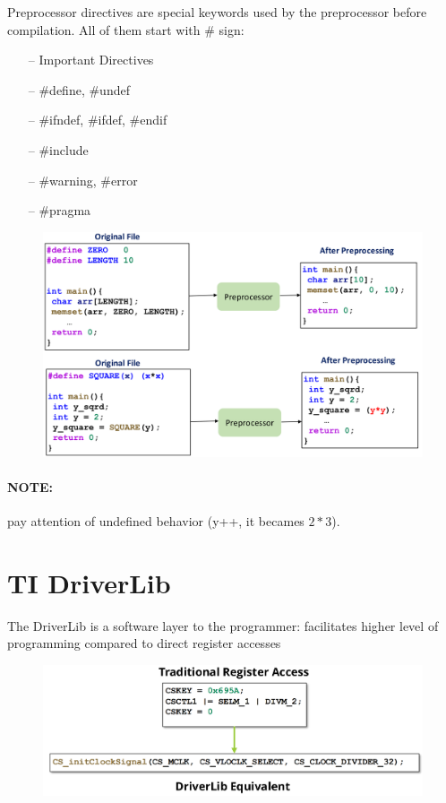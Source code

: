 Preprocessor directives are special keywords used by the preprocessor before compilation.
All of them start with \# sign:

\begin{itemize}
    \item[--] Important Directives
    \item[--] \#define, \#undef
    \item[--] \#ifndef, \#ifdef, \#endif
    \item[--] \#include
    \item[--] \#warning, \#error
    \item[--] \#pragma
\end{itemize}


\begin{figure}[H]
    \centering
    \includegraphics[width=0.75\linewidth]{img/image85.png}
\end{figure}

\paragraph{NOTE:} pay attention of undefined behavior (y++, it becames $2*3$).

\section{TI DriverLib}

The DriverLib is a software layer to the programmer: facilitates higher level of programming compared to direct register accesses

\begin{figure}[H]
    \centering
    \includegraphics[width=0.75\linewidth]{img/image86.png}
\end{figure}